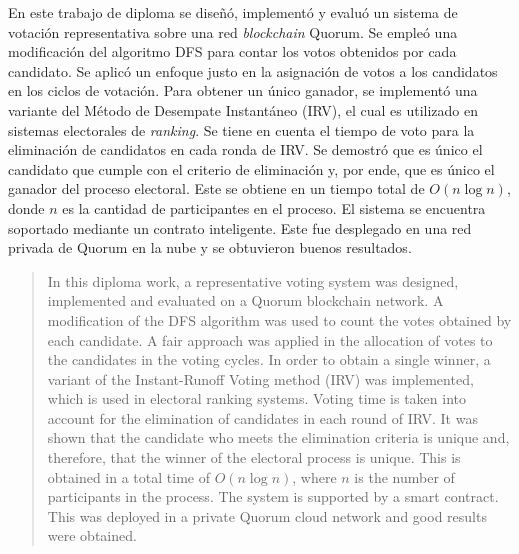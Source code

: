 \begin{resumen}
	En este trabajo de diploma se dise\~n\'o, implement\'o y evalu\'o un sistema de votaci\'on  representativa sobre una red \textit{blockchain}  Quorum.  Se emple\'o una  modificaci\'on del algoritmo DFS para contar los votos obtenidos por cada candidato. Se aplic\'o un enfoque justo en la asignaci\'on de votos a los candidatos en los ciclos de votaci\'on. Para obtener un \'unico ganador, se implement\'o una variante del M\'etodo de Desempate Instant\'aneo (IRV), el cual es utilizado en sistemas electorales de \textit{ranking}. Se tiene en cuenta  el tiempo de voto para la eliminaci\'on de candidatos en cada ronda de IRV. Se demostr\'o que es \'unico el candidato que cumple con el criterio de eliminaci\'on y, por ende, que es \'unico el ganador del proceso electoral. Este se obtiene en un tiempo total de $O(n \log n)$, donde $n$ es la cantidad de participantes en el proceso. El sistema se encuentra soportado mediante un contrato inteligente. Este fue desplegado en una red privada de Quorum en la nube y se obtuvieron buenos resultados.
\end{resumen}

\begin{abstract}
	In this diploma work, a representative voting system was designed, implemented and evaluated on a Quorum blockchain network. A modification of the DFS algorithm was used to count the votes obtained by each candidate. A fair approach was applied in the allocation of votes to the candidates in the voting cycles. In order to obtain a single winner, a variant of the Instant-Runoff Voting method (IRV) was implemented, which is used in electoral ranking systems. Voting time is taken into account for the elimination of candidates in each round of IRV. It was shown that the candidate who meets the elimination criteria is unique and, therefore, that the winner of the electoral process is unique. This is obtained in a total time of $O(n \log n)$, where $n$ is the number of participants in the process. The system is supported by a smart contract. This was deployed in a private Quorum cloud network and good results were obtained.
\end{abstract}